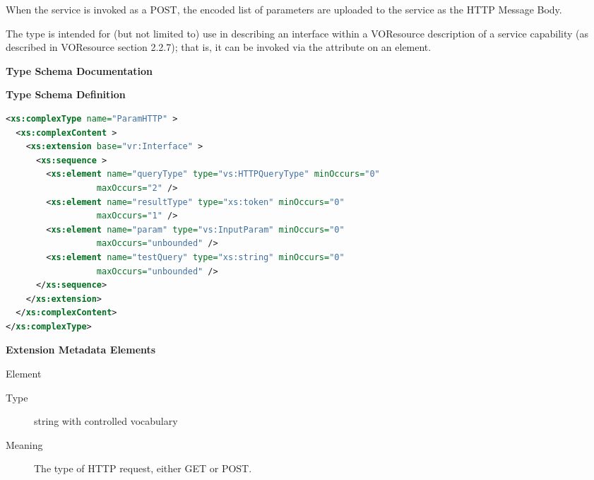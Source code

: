 \documentclass[11pt,a4paper]{ivoa}
\begin{document}
When the service is invoked as a POST, the encoded list of parameters
are uploaded to the service as the HTTP Message Body.  


The  type is intended for (but not limited
to) use in describing an interface within a VOResource description of
a service capability (as described in VOResource
section 2.2.7); that is, it can be invoked via the
 attribute on an 
element. 


\begin{generated}
\begingroup
      	\renewcommand*\descriptionlabel[1]{%
      	\hbox to 5.5em{\emph{#1}\hfil}}\vspace{2ex}\noindent\textbf{ Type Schema Documentation}



\vspace{1ex}\noindent\textbf{ Type Schema Definition}

\begin{lstlisting}[language=XML,basicstyle=\footnotesize]
<xs:complexType name="ParamHTTP" >
  <xs:complexContent >
    <xs:extension base="vr:Interface" >
      <xs:sequence >
        <xs:element name="queryType" type="vs:HTTPQueryType" minOccurs="0"
                  maxOccurs="2" />
        <xs:element name="resultType" type="xs:token" minOccurs="0"
                  maxOccurs="1" />
        <xs:element name="param" type="vs:InputParam" minOccurs="0"
                  maxOccurs="unbounded" />
        <xs:element name="testQuery" type="xs:string" minOccurs="0"
                  maxOccurs="unbounded" />
      </xs:sequence>
    </xs:extension>
  </xs:complexContent>
</xs:complexType>
\end{lstlisting}

\vspace{0.5ex}\noindent\textbf{ Extension Metadata Elements}

\begingroup\small\begin{bigdescription}\item[Element \xmlel{queryType}]
\begin{description}
\item[Type] string with controlled vocabulary
\item[Meaning] 
                       The type of HTTP request, either GET or POST.
                     

\end{description}
\end{bigdescription}
\end{generated}
\end{document}
